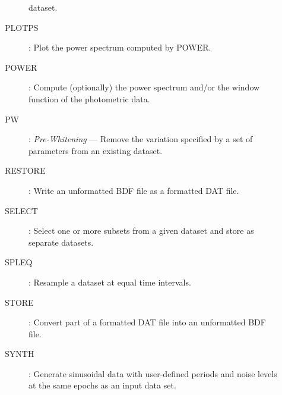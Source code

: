 \begin{description}
\begin{description}
dataset.
\item [PLOTPS]: Plot the power spectrum computed by POWER.
\item [POWER]: Compute (optionally) the power spectrum and/or the window
function of the photometric data.
\item [PW]: {\em Pre-Whitening} --- Remove the variation specified by a set of
parameters from an existing dataset.
\item [RESTORE]: Write an unformatted BDF file as a formatted DAT file.
\item [SELECT]: Select one or more subsets from a given dataset and store as
separate datasets.
\item [SPLEQ]: Resample a dataset at equal time intervals.
\item [STORE]: Convert part of a formatted DAT file into an unformatted BDF
file.
\item [SYNTH]: Generate sinusoidal data with user-defined periods and noise
levels at the same epochs as an input data set.
\end{description}
\end{description}
